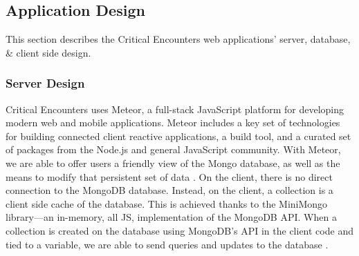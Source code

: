 \documentclass[letterpaper, 10 pt, conference]{ieeeconf}
\begin{document}
\subsection{Application Design}
This section describes the Critical Encounters web applications' server, database, \& client side design.
\subsubsection{Server Design}
Critical Encounters uses Meteor, a full-stack JavaScript platform for developing modern web and mobile
applications. Meteor includes a key set of technologies for building connected client
reactive applications, a build tool, and a curated set of packages from the
Node.js and general JavaScript community. With Meteor, we are able to offer users a friendly view of the Mongo database, as well as the means to modify that persistent set of data \cite{c1}. On the client, there is no direct connection to the MongoDB database.
Instead, on the client, a collection is a client side cache of the database. This is
achieved thanks to the MiniMongo library—an in-memory, all JS, implementation
of the MongoDB API. When a collection is created on the database using MongoDB's API in the client code and tied to a variable, we are able to send queries and updates to the database \cite{c1}.
\end{document}
